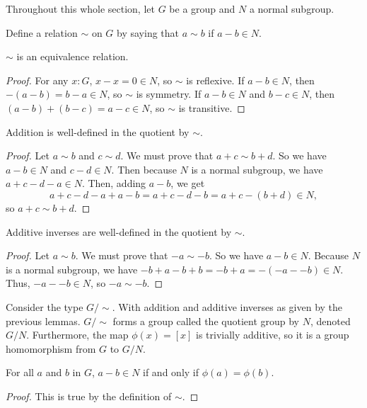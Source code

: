 \documentclass[../../math.tex]{subfiles}
\begin{document}
Throughout this whole section, let $G$ be a group and $N$ a normal subgroup.

\begin{definition}
    Define a relation $\sim$ on $G$ by saying that $a \sim b$ if $a - b \in N$.
\end{definition}

\begin{instance}
    $\sim$ is an equivalence relation.
\end{instance}
\begin{proof}
    For any $x : G$, $x - x = 0 \in N$, so $\sim$ is reflexive.  If $a - b \in
    N$, then $-(a - b) = b - a \in N$, so $\sim$ is symmetry.  If $a - b \in N$
    and $b - c \in N$, then $(a - b) + (b - c) = a - c \in N$, so $\sim$ is
    transitive.
\end{proof}

\begin{lemma}
    Addition is well-defined in the quotient by $\sim$.
\end{lemma}
\begin{proof}
    Let $a \sim b$ and $c \sim d$.  We must prove that $a + c \sim b + d$.  So
    we have $a - b \in N$ and $c - d \in N$.  Then because $N$ is a normal
    subgroup, we have $a + c - d - a \in N$.  Then, adding $a - b$, we get
    \[
        a + c - d - a + a - b
        = a + c - d - b
        = a + c - (b + d) \in N,
    \]
    so $a + c \sim b + d$.
\end{proof}

\begin{lemma}
    Additive inverses are well-defined in the quotient by $\sim$.
\end{lemma}
\begin{proof}
    Let $a \sim b$.  We must prove that $-a \sim -b$.  So we have $a - b \in N$.
    Because $N$ is a normal subgroup, we have $-b + a - b + b = -b + a = -(-a -
    -b) \in N$.  Thus, $-a - -b \in N$, so $-a \sim -b$.
\end{proof}

\begin{definition}
    Consider the type $G/{\sim}$.  With addition and additive inverses as given
    by the previous lemmas.  $G/{\sim}$ forms a group called the quotient group
    by $N$, denoted $G/N$.  Furthermore, the map $\phi(x) = [x]$ is trivially
    additive, so it is a group homomorphism from $G$ to $G/N$.
\end{definition}

\begin{theorem} \label{to_qgroup_eq}
    For all $a$ and $b$ in $G$, $a - b \in N$ if and only if $\phi(a) =
    \phi(b)$.
\end{theorem}
\begin{proof}
    This is true by the definition of $\sim$.
\end{proof}
\end{document}
